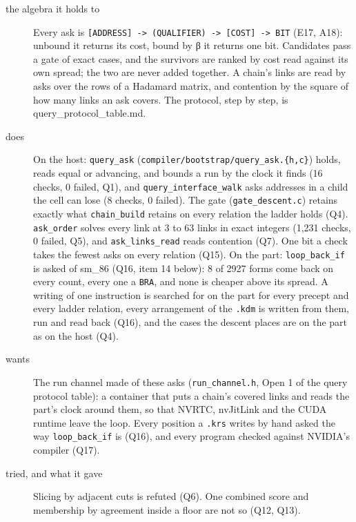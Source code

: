 \begin{description}
\item[{the algebra it holds to}] Every ask is \texttt{[ADDRESS] -\allowbreak{}> (QUALIFIER) -\allowbreak{}> [COST] -\allowbreak{}> BIT} (E17, A18): unbound it returns its cost, bound by β it returns one bit. Candidates pass a gate of exact cases, and the survivors are ranked by cost read against its own spread; the two are never added together. A chain's links are read by asks over the rows of a Hadamard matrix, and contention by the square of how many links an ask covers. The protocol, step by step, is query\_\allowbreak{}protocol\_\allowbreak{}table.md.
\item[{does}] On the host: \texttt{query\_\allowbreak{}ask} (\texttt{compiler/\allowbreak{}bootstrap/\allowbreak{}query\_\allowbreak{}ask.\allowbreak{}\{h,c\}}) holds, reads equal or advancing, and bounds a run by the clock it finds (16 checks, 0 failed, Q1), and \texttt{query\_\allowbreak{}interface\_\allowbreak{}walk} asks addresses in a child the cell can lose (8 checks, 0 failed). The gate (\texttt{gate\_\allowbreak{}descent.\allowbreak{}c}) retains exactly what \texttt{chain\_\allowbreak{}build} retains on every relation the ladder holds (Q4). \texttt{ask\_\allowbreak{}order} solves every link at 3 to 63 links in exact integers (1,231 checks, 0 failed, Q5), and \texttt{ask\_\allowbreak{}links\_\allowbreak{}read} reads contention (Q7). One bit a check takes the fewest asks on every relation (Q15). On the part: \texttt{loop\_\allowbreak{}back\_\allowbreak{}if} is asked of sm\_\allowbreak{}86 (Q16, item 14 below): 8 of 2927 forms come back on every count, every one a \texttt{BRA}, and none is cheaper above its spread. A writing of one instruction is searched for on the part for every precept and every ladder relation, every arrangement of the \texttt{.\allowbreak{}kdm} is written from them, run and read back (Q16), and the cases the descent places are on the part as on the host (Q4).
\item[{wants}] The run channel made of these asks (\texttt{run\_\allowbreak{}channel.\allowbreak{}h}, Open 1 of the query protocol table): a container that puts a chain's covered links and reads the part's clock around them, so that NVRTC, nvJitLink and the CUDA runtime leave the loop. Every position a \texttt{.\allowbreak{}krs} writes by hand asked the way \texttt{loop\_\allowbreak{}back\_\allowbreak{}if} is (Q16), and every program checked against NVIDIA's compiler (Q17).
\item[{tried, and what it gave}] Slicing by adjacent cuts is refuted (Q6). One combined score and membership by agreement inside a floor are not so (Q12, Q13).

\end{description}
